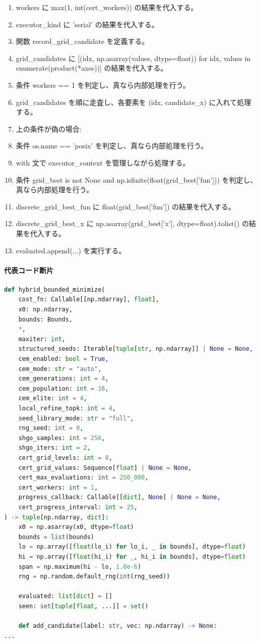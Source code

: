 \documentclass[a4paper,11pt]{article}
\begin{document}
\begin{enumerate}[leftmargin=1.8em]
\item     workers に max(1, int(cert\_workers)) の結果を代入する。
\item     executor\_kind に 'serial' の結果を代入する。
\item     関数 record\_grid\_candidate を定義する。
\item     grid\_candidates に [(idx, np.asarray(values, dtype=float)) for idx, values in enumerate(product(*axes))] の結果を代入する。
\item     条件 workers == 1 を判定し、真なら内部処理を行う。
\item       grid\_candidates を順に走査し、各要素を (idx, candidate\_x) に入れて処理する。
\item       上の条件が偽の場合:
\item       条件 os.name == 'posix' を判定し、真なら内部処理を行う。
\item       with 文で executor\_context を管理しながら処理する。
\item     条件 grid\_best is not None and np.isfinite(float(grid\_best['fun'])) を判定し、真なら内部処理を行う。
\item       discrete\_grid\_best\_fun に float(grid\_best['fun']) の結果を代入する。
\item       discrete\_grid\_best\_x に np.asarray(grid\_best['x'], dtype=float).tolist() の結果を代入する。
\item       evaluated.append(...) を実行する。
            \end{enumerate}
            \paragraph{代表コード断片}
            \begin{lstlisting}[language=Python]
def hybrid_bounded_minimize(
    cost_fn: Callable[[np.ndarray], float],
    x0: np.ndarray,
    bounds: Bounds,
    *,
    maxiter: int,
    structured_seeds: Iterable[tuple[str, np.ndarray]] | None = None,
    cem_enabled: bool = True,
    cem_mode: str = "auto",
    cem_generations: int = 4,
    cem_population: int = 16,
    cem_elite: int = 4,
    local_refine_topk: int = 4,
    seed_library_mode: str = "full",
    rng_seed: int = 0,
    shgo_samples: int = 256,
    shgo_iters: int = 2,
    cert_grid_levels: int = 0,
    cert_grid_values: Sequence[float] | None = None,
    cert_max_evaluations: int = 250_000,
    cert_workers: int = 1,
    progress_callback: Callable[[dict], None] | None = None,
    cert_progress_interval: int = 25,
) -> tuple[np.ndarray, dict]:
    x0 = np.asarray(x0, dtype=float)
    bounds = list(bounds)
    lo = np.array([float(lo_i) for lo_i, _ in bounds], dtype=float)
    hi = np.array([float(hi_i) for _, hi_i in bounds], dtype=float)
    span = np.maximum(hi - lo, 1.0e-6)
    rng = np.random.default_rng(int(rng_seed))

    evaluated: list[dict] = []
    seen: set[tuple[float, ...]] = set()

    def add_candidate(label: str, vec: np.ndarray) -> None:
...
\end{lstlisting}
\end{document}

